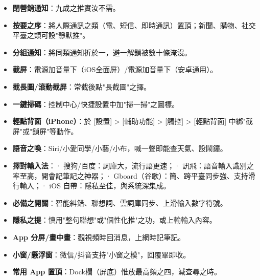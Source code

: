 
\begin{itemize}
  \item \textbf{閉營銷通知}：九成之推實汝不需。
  \item \textbf{按要之序}：將人際通訊之類（電、短信、即時通訊）置頂；新聞、購物、社交平臺之類可設"靜默推"。
  \item \textbf{分組通知}：將同類通知折於一，避一解鎖被數十條淹沒。
\end{itemize}


\begin{itemize}
  \item \textbf{截屏}：電源加音量下（iOS全面屏）/電源加音量下（安卓通用）。
  \item \textbf{截長圖/滾動截屏}：常截後點"長截圖"之擇。
  \item \textbf{一鍵掃碼}：控制中心/快捷設置中加"掃一掃"之圖標。
  \item \textbf{輕點背面（iPhone）}：於 [設置] > [輔助功能] > [觸控] > [輕點背面] 中綁"截屏"或"鎖屏"等動作。
  \item \textbf{語音之喚}：Siri/小愛同學/小藝/小布，喊一聲即能查天氣、設鬧鐘。
\end{itemize}


\begin{itemize}
  \item \textbf{擇對輸入法}：\newline · 搜狗/百度：詞庫大，流行語更速；\newline · 訊飛：語音輸入識別之率至高，開會記筆記之神器；\newline · Gboard（谷歌）：簡、跨平臺同步強、支持滑行輸入；\newline · iOS 自帶：隱私至佳，與系統深集成。
  \item \textbf{必備之開關}：智能糾錯、聯想詞、雲詞庫同步、上滑輸入數字符號。
  \item \textbf{隱私之提}：慎用"整句聯想"或"個性化推"之功，或上輸輸入內容。
\end{itemize}


\begin{itemize}
  \item \textbf{App 分屏/畫中畫}：觀視頻時回消息，上網時記筆記。
  \item \textbf{小窗/懸浮窗}：微信/抖音支持"小窗之模"，回覆畢即收。
  \item \textbf{常用 App 置頂}：Dock欄（屏底）惟放最高頻之四，減查尋之時。
\end{itemize}

